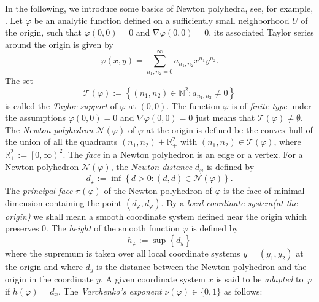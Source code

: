 \documentclass[12pt]{amsart}
\newcommand{\R}{\mathbb{R}}
\begin{document}




In the following, we introduce some basics of Newton polyhedra, see, for example, \cite{A3, V76, PS97,IM16, IKM10}. Let $\varphi$ be an analytic function defined on a sufficiently small neighborhood $U$ of the origin, such that $\varphi\left(0,0\right)=0$ and $\nabla\varphi\left(0,0\right)=0$, its associated Taylor series around the origin is given by
\begin{equation*}
    \varphi\left(x,y\right)=\sum_{n_{1},n_{2}=0}^{\infty}a_{n_{1},n_{2}}x^{n_{1}}y^{n_{2}}.
\end{equation*}
The set
\begin{equation*}
    \mathcal{T}\left(\varphi\right):=\left\{\left(n_{1},n_{2}\right)\in\mathbb{N}^{2}:a_{n_{1},n_{2}}\neq 0\right\}
\end{equation*}
is called the \textit{Taylor support} of $\varphi$ at $\left(0,0\right)$.  The function $\varphi$ is of \textit{finite type} under the assumptions $\varphi\left(0,0\right)=0$ and $\nabla\varphi\left(0,0\right)=0$ just means that $\mathcal{T}\left(\varphi\right)\neq \emptyset$. The \textit{Newton polyhedron} $\mathcal{N}\left(\varphi\right)$ of $\varphi$ at the origin is defined be the convex hull of the union of all the quadrants $\left(n_{1},n_{2}\right)+\R_{+}^{2}$ with $\left(n_{1},n_{2}\right)\in\mathcal{T}\left(\varphi\right)$, where $\R_{+}^{2}:=\left[0,\infty\right)^{2}$. The \textit{face} in a Newton polyhedron is an edge or a vertex. For a Newton polyhedron $\mathcal{N}\left(\varphi\right)$, the \textit{Newton distance} $d_{\varphi}$ is defined by
\begin{equation*}
    d_{\varphi}:=\inf\left\{d>0:\left(d,d\right)\in\mathcal{N}\left(\varphi\right)\right\}.
\end{equation*}
The \textit{principal face} $\pi\left(\varphi\right)$ of the Newton polyhedron of $\varphi$ is the face of minimal dimension containing the point $\left(d_{\varphi},d_{\varphi}\right)$. By a \textit{local coordinate system(at the origin)} we shall mean a smooth coordinate system defined near the origin which preserves 0. The \textit{height} of the smooth function $\varphi$ is defined by
\begin{equation*}
    h_{\varphi}:=\sup\left\{d_{y}\right\}
\end{equation*}
where the supremum is taken over all local coordinate systems $y=\left(y_{1},y_{2}\right)$ at the origin and where $d_{y}$ is the distance between the Newton polyhedron and the origin in the coordinate $y$. A given coordinate system $x$ is said to be \textit{adapted} to $\varphi$ if $h\left(\varphi\right)=d_{x}$. The \textit{Varchenko's exponent} \cite{V76} $\nu\left(\varphi\right)\in\{0,1\}$ as follows:
\end{document}
